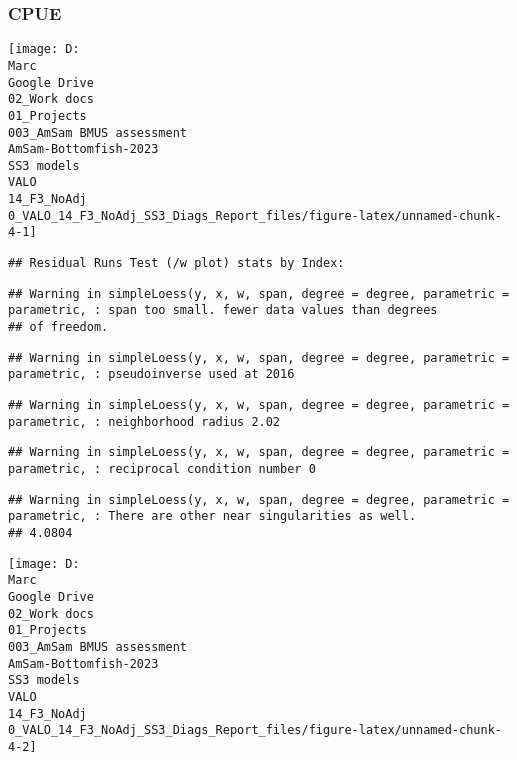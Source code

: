 \documentclass[
]{article}
\begin{document}
\hypertarget{cpue}{%
\subsubsection{CPUE}\label{cpue}}

\begin{center}\texttt{[image: D:\\Marc\\Google Drive\\02\_Work docs\\01\_Projects\\003\_AmSam BMUS assessment\\AmSam-Bottomfish-2023\\SS3 models\\VALO\\14\_F3\_NoAdj\\0\_VALO\_14\_F3\_NoAdj\_SS3\_Diags\_Report\_files/figure-latex/unnamed-chunk-4-1]} \end{center}

\begin{verbatim}
## Residual Runs Test (/w plot) stats by Index:
\end{verbatim}

\begin{verbatim}
## Warning in simpleLoess(y, x, w, span, degree = degree, parametric = parametric, : span too small. fewer data values than degrees
## of freedom.
\end{verbatim}

\begin{verbatim}
## Warning in simpleLoess(y, x, w, span, degree = degree, parametric = parametric, : pseudoinverse used at 2016
\end{verbatim}

\begin{verbatim}
## Warning in simpleLoess(y, x, w, span, degree = degree, parametric = parametric, : neighborhood radius 2.02
\end{verbatim}

\begin{verbatim}
## Warning in simpleLoess(y, x, w, span, degree = degree, parametric = parametric, : reciprocal condition number 0
\end{verbatim}

\begin{verbatim}
## Warning in simpleLoess(y, x, w, span, degree = degree, parametric = parametric, : There are other near singularities as well.
## 4.0804
\end{verbatim}

\begin{center}\texttt{[image: D:\\Marc\\Google Drive\\02\_Work docs\\01\_Projects\\003\_AmSam BMUS assessment\\AmSam-Bottomfish-2023\\SS3 models\\VALO\\14\_F3\_NoAdj\\0\_VALO\_14\_F3\_NoAdj\_SS3\_Diags\_Report\_files/figure-latex/unnamed-chunk-4-2]} \end{center}
\end{document}
